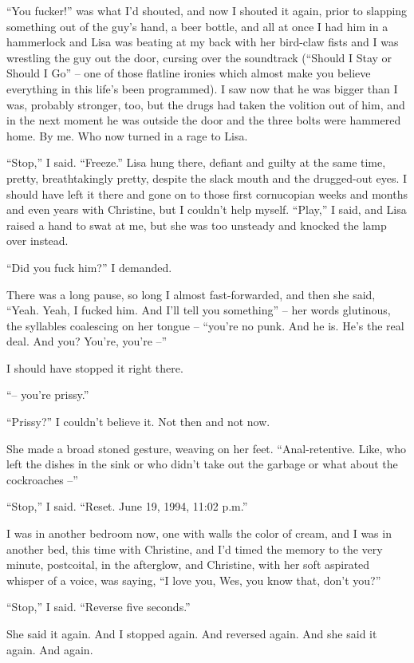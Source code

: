 \documentclass[11pt,a4paper]{article}
\newcommand{\qm}[1]{“#1”}
\begin{document}
\qm{You fucker!} was what I'd shouted, and now I shouted it again, prior to slapping something out of the guy's hand, a beer bottle, and all at once I had him in a hammerlock and Lisa was beating at my back with her bird-claw fists and I was wrestling the guy out the door, cursing over the soundtrack (\qm{Should I Stay or Should I Go} – one of those flatline ironies which almost make you believe everything in this life's been programmed). I saw now that he was bigger than I was, probably stronger, too, but the drugs had taken the volition out of him, and in the next moment he was outside the door and the three bolts were hammered home. By me. Who now turned in a rage to Lisa.

\qm{Stop,} I said. \qm{Freeze.} Lisa hung there, defiant and guilty at the same time, pretty, breathtakingly pretty, despite the slack mouth and the drugged-out eyes. I should have left it there and gone on to those first cornucopian weeks and months and even years with Christine, but I couldn't help myself. \qm{Play,} I said, and Lisa raised a hand to swat at me, but she was too unsteady and knocked the lamp over instead.

\qm{Did you fuck him?} I demanded.

There was a long pause, so long I almost fast-forwarded, and then she said, \qm{Yeah. Yeah, I fucked him. And I'll tell you something} – her words glutinous, the syllables coalescing on her tongue – \qm{you're no punk. And he is. He's the real deal. And you? You're, you're –}

I should have stopped it right there.

\qm{– you're prissy.}

\qm{Prissy?} I couldn't believe it. Not then and not now.

She made a broad stoned gesture, weaving on her feet. \qm{Anal-retentive. Like, who left the dishes in the sink or who didn't take out the garbage or what about the cockroaches –}

\qm{Stop,} I said. \qm{Reset. June 19, 1994, 11:02 p.m.}

I was in another bedroom now, one with walls the color of cream, and I was in another bed, this time with Christine, and I'd timed the memory to the very minute, postcoital, in the afterglow, and Christine, with her soft aspirated whisper of a voice, was saying, \qm{I love you, Wes, you know that, don't you?}

\qm{Stop,} I said. \qm{Reverse five seconds.}

She said it again. And I stopped again. And reversed again. And she said it again. And again.
\end{document}
